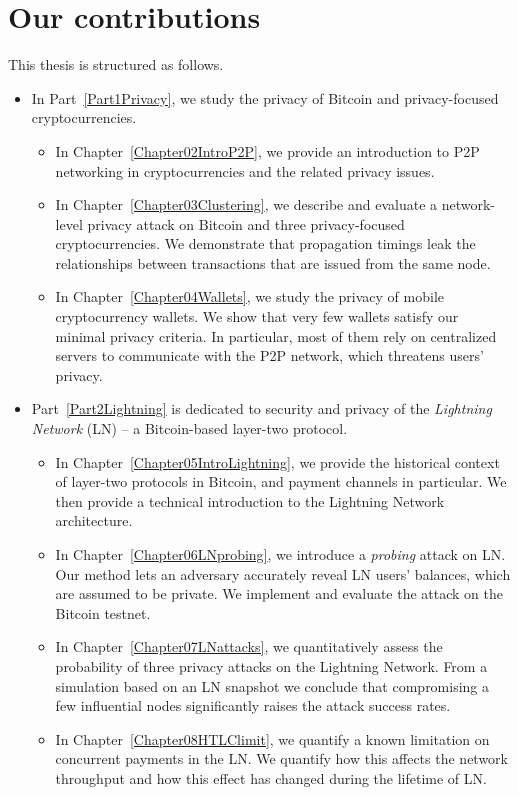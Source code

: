 \section{Our contributions}

This thesis is structured as follows.

\begin{itemize}
	\item 
	In Part~\ref{Part1Privacy}, we study the privacy of Bitcoin and privacy-focused cryptocurrencies.
	\begin{itemize}
		\item
	In Chapter~\ref{Chapter02IntroP2P}, we provide an introduction to P2P networking in cryptocurrencies and the related privacy issues.
		\item
	In Chapter~\ref{Chapter03Clustering}, we describe and evaluate a network-level privacy attack on Bitcoin and three privacy-focused cryptocurrencies.
	We demonstrate that propagation timings leak the relationships between transactions that are issued from the same node.
		\item
	In Chapter~\ref{Chapter04Wallets}, we study the privacy of mobile cryptocurrency wallets.
	We show that very few wallets satisfy our minimal privacy criteria.
	In particular, most of them rely on centralized servers to communicate with the P2P network, which threatens users' privacy.
	\end{itemize}

	\item
	Part~\ref{Part2Lightning} is dedicated to security and privacy of the \textit{Lightning Network} (LN) -- a Bitcoin-based layer-two protocol.
	\begin{itemize}
		\item 
	In Chapter~\ref{Chapter05IntroLightning}, we provide the historical context of layer-two protocols in Bitcoin, and payment channels in particular.
	We then provide a technical introduction to the Lightning Network architecture.
		\item
	In Chapter~\ref{Chapter06LNprobing}, we introduce a \textit{probing} attack on LN\@.
	Our method lets an adversary accurately reveal LN users' balances, which are assumed to be private.
	We implement and evaluate the attack on the Bitcoin testnet.
		\item
	In Chapter~\ref{Chapter07LNattacks}, we quantitatively assess the probability of three privacy attacks on the Lightning Network.
	From a simulation based on an LN snapshot we conclude that compromising a few influential nodes significantly raises the attack success rates.
		\item
	In Chapter~\ref{Chapter08HTLClimit}, we quantify a known limitation on concurrent payments in the LN\@.
	We quantify how this affects the network throughput and how this effect has changed during the lifetime of LN\@.
	\end{itemize}


\end{itemize}
